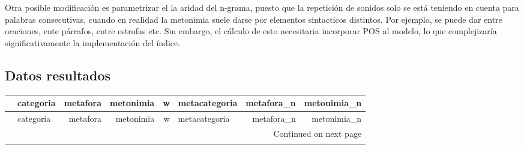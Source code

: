 \documentclass[12pt,letterpaper,twoside]{article}
\begin{document}
Otra posible modificación es parametrizar el la aridad del n-grama, puesto que la repetición de sonidos
solo se está teniendo en cuenta para palabras consecutivas, cuando en realidad la metonimia suele darse
por elementos sintacticos distintos. Por ejemplo, se puede dar entre oraciones, ente párrafos, entre estrofas
etc. Sin embargo, el cálculo de esto necesitaria incorporar POS al modelo, lo que complejizaría significativamente
la implementación del índice. 




 
\nocite{*}
\newpage
\appendix


\begin{landscape}
\tiny
\section{Datos resultados}

\begin{longtable}{llrrrlrr}
\toprule
{} &                      categoria &      metafora &   metonimia &     w & metacategoria &  metafora\_n &  metonimia\_n \\
\midrule
\endfirsthead

\toprule
{} &                      categoria &      metafora &   metonimia &     w & metacategoria &  metafora\_n &  metonimia\_n \\
\midrule
\endhead
\midrule
\multicolumn{8}{r}{{Continued on next page}} \\
\midrule
\endfoot


\end{longtable}
\end{landscape}
\end{document}
